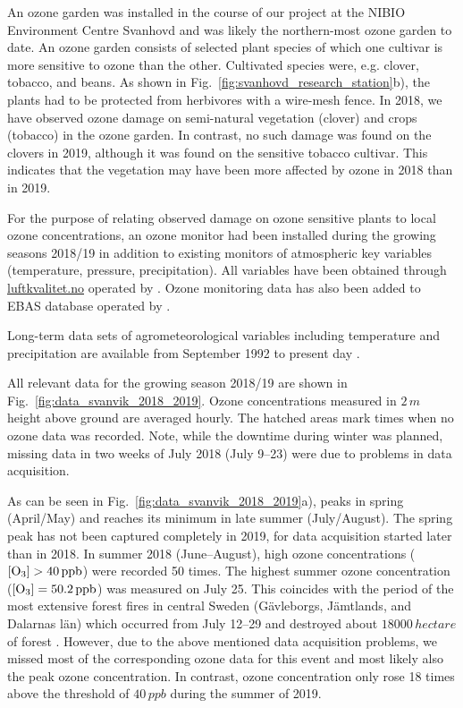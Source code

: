 \documentclass[bg, manuscript]{copernicus}
\begin{document}
An ozone garden was installed in the course of our project at the NIBIO Environment Centre Svanhovd and was likely the northern-most ozone garden to date. An ozone garden consists of selected plant species of which one cultivar is more sensitive to ozone than the other. Cultivated species were, e.g. clover, tobacco, and beans. As shown in Fig.~\ref{fig:svanhovd_research_station}b), the plants had to be protected from herbivores with a wire-mesh fence. In 2018, we have observed ozone damage on semi-natural vegetation (clover) and crops (tobacco) in the ozone garden. In contrast, no such damage was found on the clovers in 2019, although it was found on the sensitive tobacco cultivar. This indicates that the vegetation may have been more affected by ozone in 2018 than in 2019.

For the purpose of relating observed damage on ozone sensitive plants to local ozone concentrations, an ozone monitor had been installed during the growing seasons 2018/19 in addition to existing monitors of atmospheric key variables (temperature, pressure, precipitation). All variables have been obtained through \href{luftkvalitet.no}{luftkvalitet.no} operated by \citet{NILU_AIRQ}. Ozone monitoring data has also been added to EBAS database operated by \citet{NILU_EBAS}.

Long-term data sets of agrometeorological variables including temperature and precipitation are available from September 1992 to present day \citep[LandbruksMeteorologiske Tjeneste][note the station name here is Pasvik]{LMT_NIBIO}.

All relevant data for the growing season 2018/19 are shown in Fig.~\ref{fig:data_svanvik_2018_2019}. Ozone concentrations \chem{[O_3]} measured in $2\,\unit{m}$ height above ground are averaged hourly. The hatched areas mark times when no ozone data was recorded. Note, while the downtime during winter was planned, missing data in two weeks of July 2018 (July 9--23) were due to problems in data acquisition.

 As can be seen in Fig.~\ref{fig:data_svanvik_2018_2019}a), \chem{[O_3]} peaks in spring (April/May) and reaches its minimum in late summer (July/August). The spring peak has not been captured completely in 2019, for data acquisition started later than in 2018. In summer 2018 (June--August), high ozone concentrations ($\chem{[O_3]} > 40\,\unit{ppb}$) were recorded 50 times. The highest summer ozone concentration ($\chem{[O_3]} = 50.2\,\unit{ppb}$) was measured on July 25. This coincides with the period of the most extensive forest fires in central Sweden (G\"{a}vleborgs, J\"{a}mtlands, and Dalarnas l\"{a}n) which occurred from July 12--29 and destroyed about $18000\,\unit{hectare}$ of forest \citep{SOU2019}. However, due to the above mentioned data acquisition problems, we missed most of the corresponding ozone data for this event and most likely also the peak ozone concentration. In contrast, ozone concentration only rose 18 times above the threshold of $40\,\unit{ppb}$ during the summer of 2019.
\end{document}

